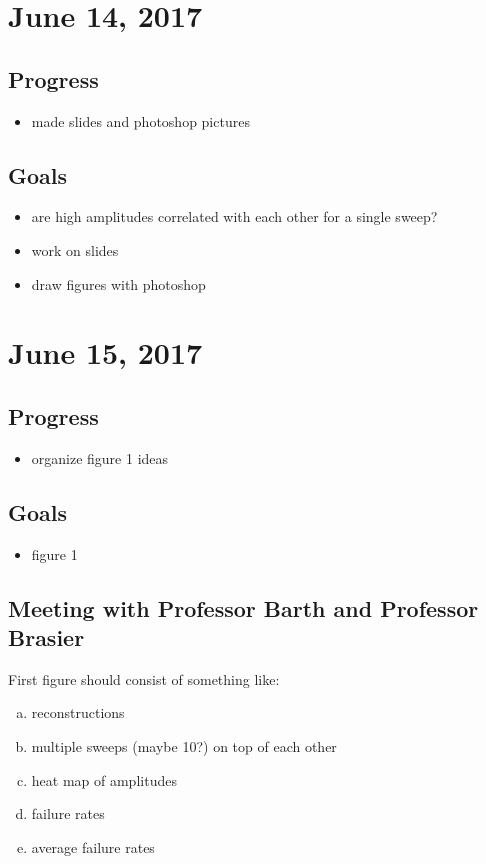 \documentclass{article}
\begin{document}
\section{June 14, 2017}
\subsection{Progress}
\begin{itemize}
  \item made slides and photoshop pictures
\end{itemize}

\subsection{Goals}
\begin{itemize}
  \item are high amplitudes correlated with each other for a single sweep?
  \item work on slides
  \item draw figures with photoshop
\end{itemize}

\section{June 15, 2017}
\subsection{Progress}
\begin{itemize}
  \item organize figure 1 ideas
\end{itemize}

\subsection{Goals}
\begin{itemize}
  \item figure 1
\end{itemize}

\subsection{Meeting with Professor Barth and Professor Brasier}
First figure should consist of something like:
\begin{enumerate}[a.]
  \item reconstructions
  \item multiple sweeps (maybe 10?) on top of each other
  \item heat map of amplitudes
  \item failure rates
  \item average failure rates
\end{enumerate}
\end{document}
